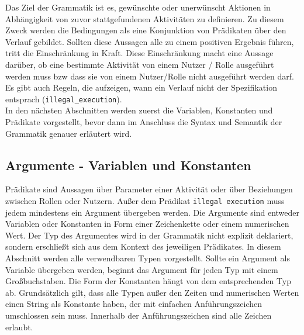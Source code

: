 Das Ziel der Grammatik ist es, gewünschte oder unerwünscht Aktionen in Abhängigkeit von zuvor stattgefundenen Aktivitäten zu definieren. Zu diesem Zweck werden die Bedingungen als eine Konjunktion von Prädikaten über den Verlauf gebildet. Sollten diese Aussagen alle zu einem positiven Ergebnis führen, tritt die Einschränkung in Kraft. Diese Einschränkung macht eine Aussage darüber, ob eine bestimmte Aktivität von einem Nutzer / Rolle ausgeführt werden muss bzw dass sie von einem Nutzer/Rolle nicht ausgeführt werden darf. Es gibt auch Regeln, die aufzeigen, wann ein Verlauf nicht der Spezifikation entsprach (\texttt{illegal\_execution}).\\
In den nächsten Abschnitten werden zuerst die Variablen, Konstanten und Prädikate vorgestellt, bevor dann im Anschluss die Syntax und Semantik der Grammatik genauer erläutert wird.

\subsection{Argumente - Variablen und Konstanten}
\label{sec:vars}

Prädikate sind Aussagen über Parameter einer Aktivität oder über Beziehungen zwischen Rollen oder Nutzern. Außer dem Prädikat \texttt{illegal execution} muss jedem mindestens ein Argument übergeben werden. Die Argumente sind entweder Variablen oder Konstanten in Form einer Zeichenkette oder einem numerischen Wert. Der Typ des Argumentes wird in der Grammatik nicht explizit deklariert, sondern erschließt sich aus dem Kontext des jeweiligen Prädikates. In diesem Abschnitt werden alle verwendbaren Typen vorgestellt. Sollte ein Argument als Variable übergeben werden, beginnt das Argument für jeden Typ mit einem Großbuchstaben. Die Form der Konstanten hängt von dem entsprechenden Typ ab. Grundsätzlich gilt, dass alle Typen außer den Zeiten und numerischen Werten einen String als Konstante haben, der mit einfachen Anführungszeichen umschlossen sein muss. Innerhalb der Anführungszeichen sind alle Zeichen erlaubt.

